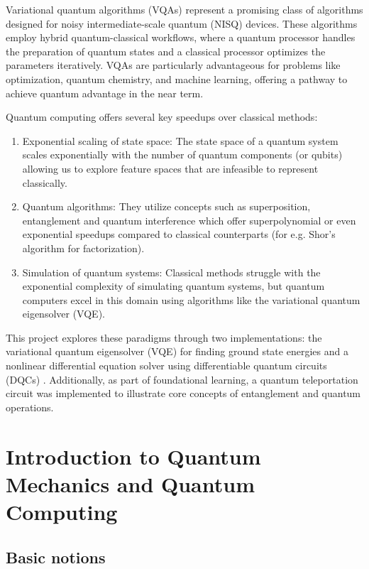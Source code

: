 \documentclass[11pt,a4paper]{article}
\begin{document}
Variational quantum algorithms (VQAs) represent a promising class of algorithms designed for noisy intermediate-scale quantum (NISQ) devices. These algorithms employ hybrid quantum-classical workflows, where a quantum processor handles the preparation of quantum states and a classical processor optimizes the parameters iteratively. VQAs are particularly advantageous for problems like optimization, quantum chemistry, and machine learning, offering a pathway to achieve quantum advantage in the near term.

Quantum computing offers several key speedups over classical methods:

\begin{enumerate}
    \item Exponential scaling of state space: The state space of a quantum system scales exponentially with the number of quantum components (or qubits) allowing us to explore feature spaces that are infeasible to represent classically.
    \item Quantum algorithms: They utilize concepts such as superposition, entanglement and quantum interference which offer superpolynomial or even exponential speedups compared to classical counterparts (for e.g. Shor's algorithm for factorization).
    \item Simulation of quantum systems: Classical methods struggle with the exponential complexity of simulating quantum systems, but quantum computers excel in this domain using algorithms like the variational quantum eigensolver (VQE).
\end{enumerate}

This project explores these paradigms through two implementations: the variational quantum eigensolver (VQE) \cite{VQA} for finding ground state energies and a nonlinear differential equation solver using differentiable quantum circuits (DQCs) \cite{DQC}. Additionally, as part of foundational learning, a quantum teleportation circuit was implemented to illustrate core concepts of entanglement and quantum operations.
  

\section{Introduction to Quantum Mechanics and Quantum Computing}

\subsection{Basic notions}
\end{document}
